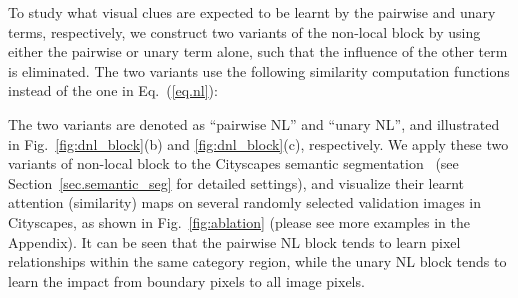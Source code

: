 \documentclass[runningheads]{llncs}
\begin{document}
\begin{table}[t]
\small
\centering
\caption{Consistency statistics between attention maps of the non-local variants and the ground-truth within-category and boundary maps on the Cityscapes validation set}
\label{tab:stat_city}
\vspace{-20pt}
\end{table}

To study what visual clues are expected to be learnt by the pairwise and unary terms, respectively, we construct two variants of the non-local block by using either the pairwise or unary term alone, such that the influence of the other term is eliminated. The two variants use the following similarity computation functions instead of the one in Eq.~(\ref{eq.nl}):
\begin{small}

\end{small}
The two variants are denoted as ``pairwise NL'' and ``unary NL'', and illustrated in Fig.~\ref{fig:dnl_block}(b)  and \ref{fig:dnl_block}(c), respectively. We apply these two variants of non-local block to the Cityscapes semantic segmentation~\cite{cordts2016cityscapes} (see Section~\ref{sec.semantic_seg} for detailed settings), and visualize their learnt attention (similarity) maps on several randomly selected validation images in Cityscapes, as shown in Fig.~\ref{fig:ablation} (please see more examples in the Appendix). It can be seen that the pairwise NL block tends to learn pixel relationships within the same category region, while the unary NL block tends to learn the impact from boundary pixels to all image pixels.
\end{document}
